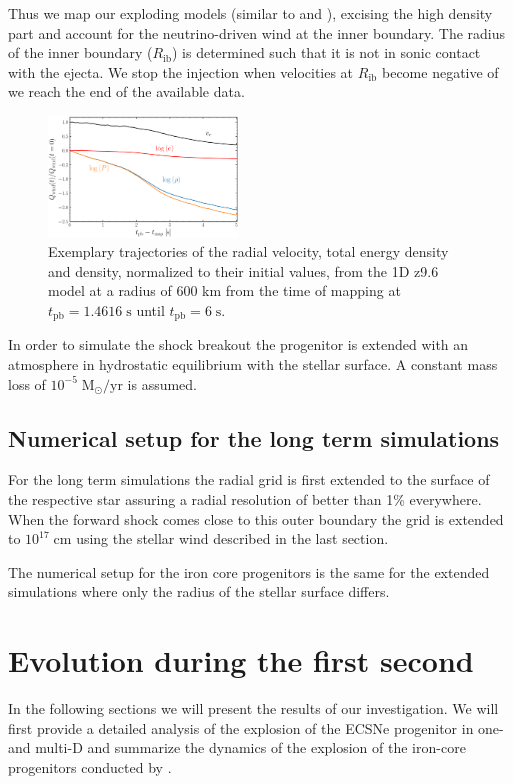 \documentclass[fleqn,usenatbib]{mnras}
\begin{document}
Thus we map our exploding models (similar to \cite{Wongwathanarat2012} and \cite{Mueller2019}), excising the high density part and account for the neutrino-driven wind at the inner boundary. The radius of the inner boundary ($R_{\text{ib}}$) is determined such that it is not in sonic contact with the ejecta. We stop the injection when velocities at $R_{\text{ib}}$ become negative of we reach the end of the available data.

\begin{figure}
\label{fig:wind}
 \centering
 \includegraphics[width=0.45\textwidth]{./pic/wind.pdf}
 \caption{Exemplary trajectories of the radial velocity, total energy density and  density, normalized to their initial values, from the 1D z9.6 model at a radius of 600 km from the time of mapping at $t_{\mathrm{pb}}= 1.4616\;\mathrm{s}$ until $t_{\mathrm{pb}}= 6\;\mathrm{s}$. }
\end{figure}

In order to simulate the shock breakout the progenitor is extended with an atmosphere in hydrostatic equilibrium with the stellar surface. A constant mass loss of $10^{-5}\;\mathrm{M_{\odot}/yr}$ is assumed. 

\subsection{Numerical setup for the long term simulations}

For the long term simulations the radial grid is first extended to the surface of the respective star assuring a radial resolution of better than 1\% everywhere. When the forward shock comes close to this outer boundary the grid is extended to $10^{17}\;\mathrm{cm}$ using the stellar wind described in the last section. 

The numerical setup for the iron core progenitors is the same for the extended simulations where only the radius of the stellar surface differs. 

\section{Evolution during the first second}
In the following sections we will present the results of our investigation. We will first provide a detailed analysis of the explosion of the ECSNe progenitor in one- and multi-D and summarize the dynamics of the explosion of the iron-core progenitors conducted by \cite{Melson2015}. 
\end{document}

